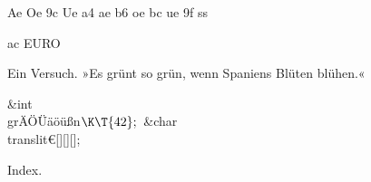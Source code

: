 

 Ae
 Oe
\ATL 9c Ue
\ATL a4 ae
\ATL b6 oe
\ATL bc ue
\ATL 9f ss


\ATL ac EURO


Ein Versuch. »Es grünt so grün, wenn Spaniens Blüten blühen.«

\Y\B\&{int} \\{grÄÖÜäöüßn}${}\K\T{42};{}$\6
\&{char} \\{translit€}[][][];\par
\fi

Index.
\fi

\inx
\fin
\con
